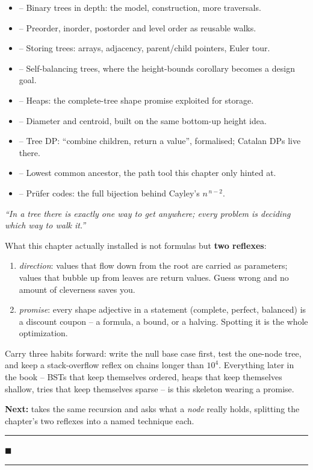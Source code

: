 
\begin{itemize}[nosep, leftmargin=1.4em]
  \item {} -- Binary trees in depth: the  model, construction, more traversals.
  \item {} -- Preorder, inorder, postorder and level order as reusable walks.
  \item {} -- Storing trees: arrays, adjacency, parent/child pointers, Euler tour.
  \item {} -- Self-balancing trees, where the height-bounds corollary becomes a design goal.
  \item {} -- Heaps: the complete-tree shape promise exploited for storage.
  \item {} -- Diameter and centroid, built on the same bottom-up height idea.
  \item {} -- Tree DP: ``combine children, return a value'', formalised; Catalan DPs live there.
  \item {} -- Lowest common ancestor, the path tool this chapter only hinted at.
  \item {} -- Pr\"ufer codes: the full bijection behind Cayley's $n^{\,n-2}$.
\end{itemize}

\begin{lastword}
\emph{``In a tree there is exactly one way to get anywhere; every problem is deciding
which way to walk it.''}

\medskip
What this chapter actually installed is not formulas but \textbf{two reflexes}:
\begin{enumerate}[nosep, leftmargin=1.6em]
  \item \emph{direction}: values that flow down from the root are carried as parameters;
        values that bubble up from leaves are return values. Guess wrong and no amount
        of cleverness saves you.
  \item \emph{promise}: every shape adjective in a statement (complete, perfect, balanced)
        is a discount coupon -- a formula, a bound, or a halving. Spotting it is the
        whole optimization.
\end{enumerate}

\medskip
Carry three habits forward: write the null base case first, test the one-node tree, and
keep a stack-overflow reflex on chains longer than $10^4$. Everything later in the
book -- BSTs that keep themselves ordered, heaps that keep themselves shallow, tries
that keep themselves sparse -- is this skeleton wearing a promise.

\medskip
\textbf{Next:}  takes the same recursion and asks what a \emph{node} really
holds, splitting the chapter's two reflexes into a named technique each.

\begin{center}\textcolor{softpurple}{\rule{0.4\linewidth}{0.6pt}\quad $\blacksquare$\quad \rule{0.4\linewidth}{0.6pt}}\end{center}
\end{lastword}
